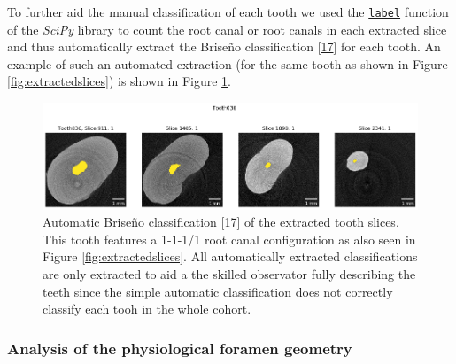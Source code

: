 \documentclass[
  american,
]{article}
\begin{document}
To further aid the manual classification of each tooth we used the \href{https://docs.scipy.org/doc/scipy/reference/generated/scipy.ndimage.label.html}{\texttt{label}} function of the \emph{SciPy} library to count the root canal or root canals in each extracted slice and thus automatically extract the Briseño classification {[}\protect\hyperlink{ref-ZTgDEakx}{17}{]} for each tooth.
An example of such an automated extraction (for the same tooth as shown in Figure \ref{fig:extractedslices}) is shown in Figure \ref{fig:briseno}.

\begin{figure}
\hypertarget{fig:briseno}{%
\centering
\includegraphics{images/Tooth036.Briseno.png}
\caption{Automatic Briseño classification {[}\protect\hyperlink{ref-ZTgDEakx}{17}{]} of the extracted tooth slices.
This tooth features a 1-1-1/1 root canal configuration as also seen in Figure \ref{fig:extractedslices}.
All automatically extracted classifications are only extracted to aid a the skilled observator fully describing the teeth since the simple automatic classification does not correctly classify each tooh in the whole cohort.}\label{fig:briseno}
}
\end{figure}

\hypertarget{analysis-of-the-physiological-foramen-geometry}{%
\subsubsection{Analysis of the physiological foramen geometry}\label{analysis-of-the-physiological-foramen-geometry}}
\end{document}
